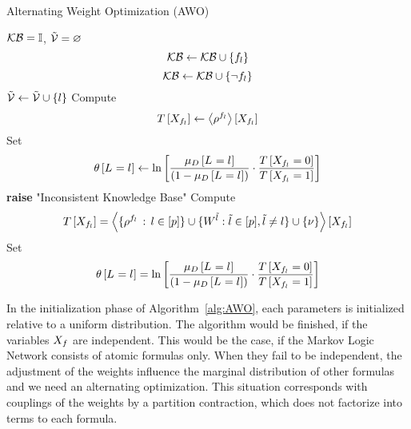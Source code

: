 \begin{algorithm}[hbt!]
\caption{Alternating Weight Optimization (AWO)}\label{alg:AWO}
\begin{algorithmic}
\State $\mathcal{KB} = \mathbb{I}$, $\tilde{\mathcal{V}}=\varnothing$
\For{$\selindexin$}
		\[ \mathcal{KB} \leftarrow \mathcal{KB} \cup \{f_{l}\}\]
		\[ \mathcal{KB} \leftarrow \mathcal{KB} \cup \{\lnot f_{l}\}\]
	\Else
		\State $\tilde{\mathcal{V}}\leftarrow \tilde{\mathcal{V}} \cup \{l\}$
	\EndIf
\EndFor
\For{$\selindex\in\secnodes$}	
		\State Compute
		\[ T\left[X_{f_{l}}\right]
		\leftarrow \left\langle \rho^{f_{l}}\right\rangle \left[ X_{f_{l}} \right] \]
		\State Set 
		\begin{align*}
	 		\theta\left[L_{}=l_{}\right] 
			\leftarrow \ln \left[ 
			\frac{\mu_{D}\left[L_{}=l_{}\right]}{(1-\mu_{D}\left[L_{}=l_{}\right])} 
			\cdot \frac{T\left[X_{f_{l}}=0\right]}{T\left[X_{f_{l}}=1\right]} 
			 \right] 
		\end{align*}
\EndFor
{}
	 \State \textbf{raise} "Inconsistent Knowledge Base"
\EndIf
{}
\For{$\selindex\in\secnodes$}
	\State Compute
	\begin{align*}
	 	T\left[X_{f_{l}}\right] 
		= \left\langle \{\rho^{f_{l}} \, : \, l\in[p]\}
		\cup\{W^{\tilde{l}} : \tilde{l} \in [p], \tilde{l}\neq l\}
		\cup\{\nu\}\right\rangle \left[ X_{f_{l}} \right]
	\end{align*}
	\State Set 
	\begin{align*}
	 	\theta\left[L_{}=l_{}\right] = \ln \left[ 
		\frac{\mu_{D}\left[L_{}=l_{}\right]}{(1-\mu_{D}\left[L_{}=l_{}\right])} 
		\cdot \frac{T\left[X_{f_{l}}=0\right]}{T\left[X_{f_{l}}=1\right]} 
		 \right] 
	\end{align*}
\EndFor
\EndWhile
\end{algorithmic}
\end{algorithm}


In the initialization phase of Algorithm~\ref{alg:AWO}, each parameters is initialized relative to a uniform distribution. 
The algorithm would be finished, if the variables $X_{f}$ are independent.
This would be the case, if the Markov Logic Network consists of atomic formulas only.
When they fail to be independent, the adjustment of the weights influence the marginal distribution of other formulas and we need an alternating optimization.
% 
This situation corresponds with couplings of the weights by a partition contraction, which does not factorize into terms to each formula.


